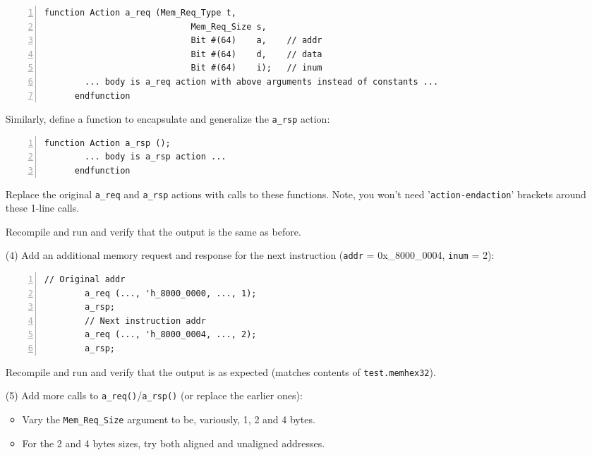 \begin{itemize}
    {\footnotesize
    \begin{Verbatim}[frame=single, numbers=left]
      function Action a_req (Mem_Req_Type t,
                             Mem_Req_Size s,
                             Bit #(64)    a,    // addr
                             Bit #(64)    d,    // data
                             Bit #(64)    i);   // inum
        ... body is a_req action with above arguments instead of constants ...
      endfunction
    \end{Verbatim}
    }

    Similarly, define a function to encapsulate and generalize the
    \verb|a_rsp| action:

    {\footnotesize
    \begin{Verbatim}[frame=single, numbers=left]
      function Action a_rsp ();
        ... body is a_rsp action ...
      endfunction
    \end{Verbatim}
    }

    Replace the original \verb|a_req| and \verb|a_rsp| actions with
    calls to these functions.  Note, you won't need
    '\verb|action-endaction|' brackets around these 1-line calls.

    Recompile and run and verify that the output is the same as before.

\item[(4)] Add an additional memory request and response for the next
    instruction ({\tt addr} = 0x\_8000\_0004, {\tt inum} = 2):

    {\footnotesize
    \begin{Verbatim}[frame=single, numbers=left]
        // Original addr
        a_req (..., 'h_8000_0000, ..., 1);
        a_rsp;    
        // Next instruction addr
        a_req (..., 'h_8000_0004, ..., 2);
        a_rsp;    
    \end{Verbatim}
    }

    Recompile and run and verify that the output is as expected
    (matches contents of \verb|test.memhex32|).

\item[(5)] Add more calls to \verb|a_req()|/\verb|a_rsp()| (or replace
    the earlier ones):

    \begin{itemize}

    \item Vary the \verb|Mem_Req_Size| argument to be, variously, 1, 2
        and 4 bytes.

    \item For the 2 and 4 bytes sizes, try both aligned and unaligned
        addresses.
    \end{itemize}


\end{itemize}
